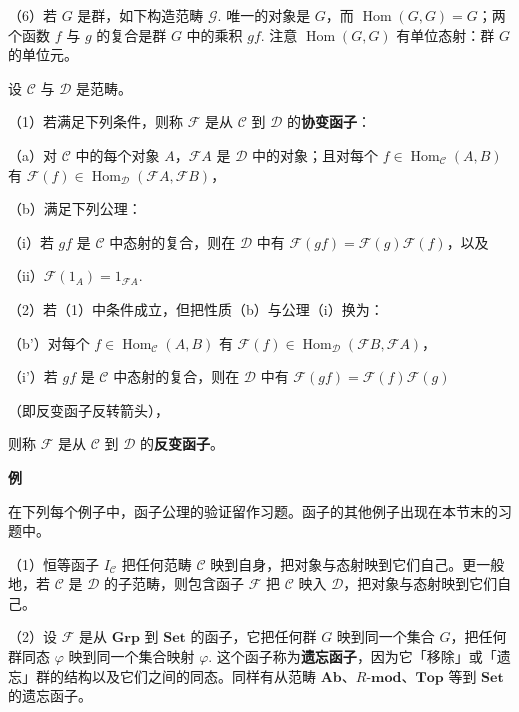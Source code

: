 （6）若 \(G\) 是群，如下构造范畴 \(\mathcal{G}\). 唯一的对象是 \(G\)，而 \(\operatorname{Hom}(G, G) = G\)；两个函数 \(f\) 与 \(g\) 的复合是群 \(G\) 中的乘积 \(gf\). 注意 \(\operatorname{Hom}(G, G)\) 有单位态射：群 \(G\) 的单位元。

\begin{definition}
设 \(\mathcal{C}\) 与 \(\mathcal{D}\) 是范畴。

（1）若满足下列条件，则称 \(\mathcal{F}\) 是从 \(\mathcal{C}\) 到 \(\mathcal{D}\) 的\textbf{协变函子}：

（a）对 \(\mathcal{C}\) 中的每个对象 \(A\)，\(\mathcal{F}A\) 是 \(\mathcal{D}\) 中的对象；且对每个 \(f \in \operatorname{Hom}_{\mathcal{C}}(A, B)\) 有 \(\mathcal{F}(f) \in \operatorname{Hom}_{\mathcal{D}}(\mathcal{F}A, \mathcal{F}B)\)，

（b）满足下列公理：

（i）若 \(gf\) 是 \(\mathcal{C}\) 中态射的复合，则在 \(\mathcal{D}\) 中有 \(\mathcal{F}(gf) = \mathcal{F}(g)\mathcal{F}(f)\)，以及

（ii）\(\mathcal{F}(1_A) = 1_{\mathcal{F}A}\).

（2）若（1）中条件成立，但把性质（b）与公理（i）换为：

（b'）对每个 \(f \in \operatorname{Hom}_{\mathcal{C}}(A, B)\) 有 \(\mathcal{F}(f) \in \operatorname{Hom}_{\mathcal{D}}(\mathcal{F}B, \mathcal{F}A)\)，

（i'）若 \(gf\) 是 \(\mathcal{C}\) 中态射的复合，则在 \(\mathcal{D}\) 中有 \(\mathcal{F}(gf) = \mathcal{F}(f)\mathcal{F}(g)\)

（即反变函子反转箭头），

则称 \(\mathcal{F}\) 是从 \(\mathcal{C}\) 到 \(\mathcal{D}\) 的\textbf{反变函子}。
\end{definition}

\noindent\textbf{例}

在下列每个例子中，函子公理的验证留作习题。函子的其他例子出现在本节末的习题中。

（1）恒等函子 \(I_{\mathcal{C}}\) 把任何范畴 \(\mathcal{C}\) 映到自身，把对象与态射映到它们自己。更一般地，若 \(\mathcal{C}\) 是 \(\mathcal{D}\) 的子范畴，则包含函子 \(\mathcal{F}\) 把 \(\mathcal{C}\) 映入 \(\mathcal{D}\)，把对象与态射映到它们自己。

（2）设 \(\mathcal{F}\) 是从 \(\mathbf{Grp}\) 到 \(\mathbf{Set}\) 的函子，它把任何群 \(G\) 映到同一个集合 \(G\)，把任何群同态 \(\varphi\) 映到同一个集合映射 \(\varphi\). 这个函子称为\textbf{遗忘函子}，因为它「移除」或「遗忘」群的结构以及它们之间的同态。同样有从范畴 \(\mathbf{Ab}\)、\(R\text{-}\mathbf{mod}\)、\(\mathbf{Top}\) 等到 \(\mathbf{Set}\) 的遗忘函子。

